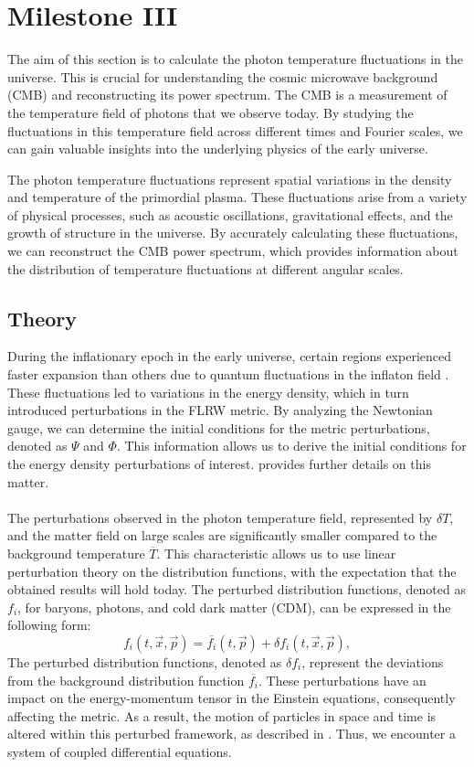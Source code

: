 \documentclass{aa}
\begin{document}
\section{Milestone III}\label{section:M3}
The aim of this section is to calculate the photon temperature fluctuations in the universe. This is crucial for understanding the cosmic microwave background (CMB) and reconstructing its power spectrum. The CMB is a measurement of the temperature field of photons that we observe today. By studying the fluctuations in this temperature field across different times and Fourier scales, we can gain valuable insights into the underlying physics of the early universe.

The photon temperature fluctuations represent spatial variations in the density and temperature of the primordial plasma. These fluctuations arise from a variety of physical processes, such as acoustic oscillations, gravitational effects, and the growth of structure in the universe. By accurately calculating these fluctuations, we can reconstruct the CMB power spectrum, which provides information about the distribution of temperature fluctuations at different angular scales.


\subsection{Theory}
During the inflationary epoch in the early universe, certain regions experienced faster expansion than others due to quantum fluctuations in the inflaton field \cite{3}. These fluctuations led to variations in the energy density, which in turn introduced perturbations in the FLRW metric. By analyzing the Newtonian gauge, we can determine the initial conditions for the metric perturbations, denoted as $\Psi$ and $\Phi$. This information allows us to derive the initial conditions for the energy density perturbations of interest. \cite{3} provides further details on this matter.\\
\noindent
\\
The perturbations observed in the photon temperature field, represented by $\delta T$, and the matter field on large scales are significantly smaller compared to the background temperature $\overline{T}$. This characteristic allows us to use linear perturbation theory on the distribution functions, with the expectation that the obtained results will hold today. The perturbed distribution functions, denoted as $f_i$, for baryons, photons, and cold dark matter (CDM), can be expressed in the following form:
\[f_i(t,\vec{x},\vec{p})= \overline{f_i}(t,\vec{p}) + \delta f_i(t,\vec{x},\vec{p}),\] 
The perturbed distribution functions, denoted as $\delta f_i$, represent the deviations from the background distribution function $\overline{f_i}$. These perturbations have an impact on the energy-momentum tensor in the Einstein equations, consequently affecting the metric. As a result, the motion of particles in space and time is altered within this perturbed framework, as described in \cite{3}. Thus, we encounter a system of coupled differential equations.
\end{document}
